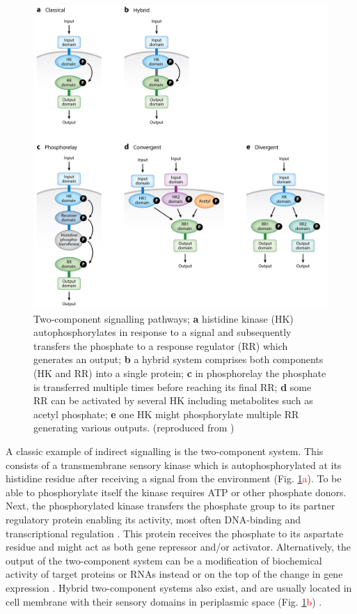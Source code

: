 \begin{figure}[ht!]
  \centering
  \includegraphics[scale=0.8]{text/Pictures/TwoComponent.jpeg}
    \caption{Two-component signalling pathways; \textbf{a} histidine kinase (HK) autophosphorylates in response to a signal and subsequently transfers the phosphate to a response regulator (RR) which generates an output; \textbf{b} a hybrid system comprises both components (HK and RR) into a single protein; \textbf{c} in phosphorelay the phosphate is transferred multiple times before reaching its final RR; \textbf{d} some RR can be activated by several HK including metabolites such as acetyl phosphate; \textbf{e} one HK might phosphorylate multiple RR generating various outputs. (reproduced from \cite{groisman2016feedback})}
    \label{two}
\end{figure}

A classic example of indirect signalling is the two-component system.
This consists of a transmembrane sensory kinase which is autophosphorylated at its histidine residue after receiving a signal from the environment (Fig. \ref{two}\textcolor{red}{a}).
To be able to phosphorylate itself the kinase requires ATP or other phosphate donors.
Next, the phosphorylated kinase transfers the phosphate group to its partner regulatory protein enabling its activity, most often DNA-binding and transcriptional regulation \cite{lynch2012prioritization, gao2015temporal, cui2018novel}.
This protein receives the phosphate to its aspartate residue and might act as both gene repressor and/or activator.
Alternatively, the output of the two-component system can be a modification of biochemical activity of target proteins or RNAs instead or on the top of the change in gene expression \cite{shu2002antar, chambonnier2016hybrid}.
Hybrid two-component systems also exist, and are usually located in cell membrane with their sensory domains in periplasmic space (Fig. \ref{two}\textcolor{red}{b}) \cite{lynch2012prioritization, hirano2013regulon}.

